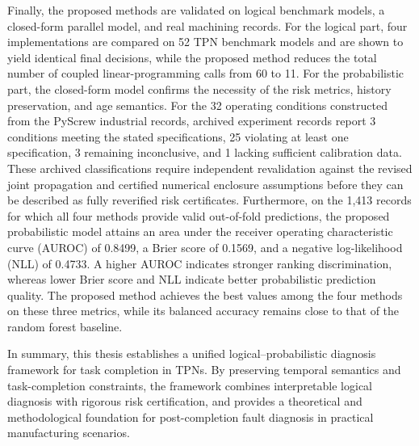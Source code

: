 \documentclass[master,fontset=ubuntu]{shnuthesis}
\theoremstyle{definition}
\begin{document}
\begin{enabstract}
Finally, the proposed methods are validated on logical benchmark models, a closed-form parallel model, and real machining records. For the logical part, four implementations are compared on 52 TPN benchmark models and are shown to yield identical final decisions, while the proposed method reduces the total number of coupled linear-programming calls from 60 to 11. For the probabilistic part, the closed-form model confirms the necessity of the risk metrics, history preservation, and age semantics. For the 32 operating conditions constructed from the PyScrew industrial records, archived experiment records report 3 conditions meeting the stated specifications, 25 violating at least one specification, 3 remaining inconclusive, and 1 lacking sufficient calibration data. These archived classifications require independent revalidation against the revised joint propagation and certified numerical enclosure assumptions before they can be described as fully reverified risk certificates. Furthermore, on the 1,413 records for which all four methods provide valid out-of-fold predictions, the proposed probabilistic model attains an area under the receiver operating characteristic curve (AUROC) of 0.8499, a Brier score of 0.1569, and a negative log-likelihood (NLL) of 0.4733. A higher AUROC indicates stronger ranking discrimination, whereas lower Brier score and NLL indicate better probabilistic prediction quality. The proposed method achieves the best values among the four methods on these three metrics, while its balanced accuracy remains close to that of the random forest baseline.

In summary, this thesis establishes a unified logical--probabilistic diagnosis framework for task completion in TPNs. By preserving temporal semantics and task-completion constraints, the framework combines interpretable logical diagnosis with rigorous risk certification, and provides a theoretical and methodological foundation for post-completion fault diagnosis in practical manufacturing scenarios.

\end{enabstract}



\maketoc

\makelof

\makelot
\end{document}
